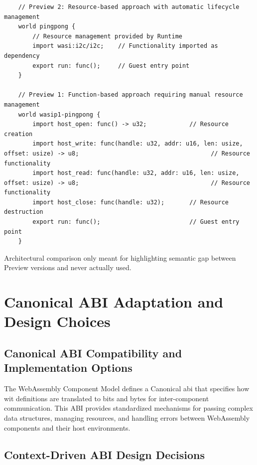 \begin{listing}[H]
    \begin{verbatim}
    // Preview 2: Resource-based approach with automatic lifecycle management
    world pingpong {
        // Resource management provided by Runtime
        import wasi:i2c/i2c;    // Functionality imported as dependency
        export run: func();     // Guest entry point
    }
    
    // Preview 1: Function-based approach requiring manual resource management
    world wasip1-pingpong {
        import host_open: func() -> u32;            // Resource creation
        import host_write: func(handle: u32, addr: u16, len: usize, offset: usize) -> u8;                                     // Resource functionality
        import host_read: func(handle: u32, addr: u16, len: usize, offset: usize) -> u8;                                     // Resource functionality
        import host_close: func(handle: u32);       // Resource destruction
        export run: func();                         // Guest entry point
    }
    \end{verbatim}
    \caption{Architectural comparison only meant for highlighting semantic gap between Preview versions and never actually used.}
    \label{lst:preview-comparison}
\end{listing}

\section{Canonical ABI Adaptation and Design Choices}
\label{sec:canonical-abi-adaptation}

\subsection{Canonical ABI Compatibility and Implementation Options}

The WebAssembly Component Model defines a Canonical \acrfull{abi} that specifies how \acrshort{wit} definitions are translated to bits and bytes for inter-component communication. This ABI provides standardized mechanisms for passing complex data structures, managing resources, and handling errors between WebAssembly components and their host environments.

\subsection{Context-Driven ABI Design Decisions}

